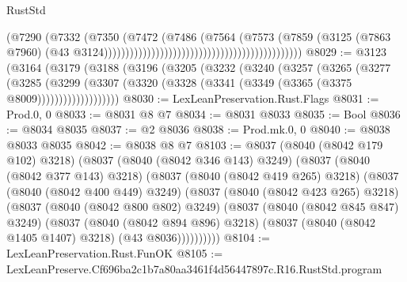 \begin{lexlean}{RustStd}
\begin{coremodule}
                                                                            (@7290
                                                                              (@7332
                                                                                (@7350
                                                                                  (@7472
                                                                                    (@7486
                                                                                      (@7564
                                                                                        (@7573
                                                                                          (@7859
                                                                                            (@3125
                                                                                              (@7863
                                                                                                @7960)
                                                                                              (@43
                                                                                                @3124))))))))))))))))))))))))))))))))))))))))))))))
@8029 := @3123
    (@3164
      (@3179
        (@3188
          (@3196
            (@3205
              (@3232
                (@3240
                  (@3257
                    (@3265
                      (@3277
                        (@3285
                          (@3299
                            (@3307
                              (@3320 (@3328 (@3341 (@3349 (@3365 (@3375 @8009)))))))))))))))))))
@8030 := LexLeanPreservation.Rust.Flags
@8031 := Prod.{0, 0}
@8033 := @8031 @8 @7
@8034 := @8031 @8033
@8035 := Bool
@8036 := @8034 @8035
@8037 := @2 @8036
@8038 := Prod.mk.{0, 0}
@8040 := @8038 @8033 @8035
@8042 := @8038 @8 @7
@8103 := @8037
    (@8040 (@8042 @179 @102) @3218)
    (@8037
      (@8040 (@8042 @346 @143) @3249)
      (@8037
        (@8040 (@8042 @377 @143) @3218)
        (@8037
          (@8040 (@8042 @419 @265) @3218)
          (@8037
            (@8040 (@8042 @400 @449) @3249)
            (@8037
              (@8040 (@8042 @423 @265) @3218)
              (@8037
                (@8040 (@8042 @800 @802) @3249)
                (@8037
                  (@8040 (@8042 @845 @847) @3249)
                  (@8037
                    (@8040 (@8042 @894 @896) @3218)
                    (@8037 (@8040 (@8042 @1405 @1407) @3218) (@43 @8036))))))))))
@8104 := LexLeanPreservation.Rust.FunOK
@8105 := LexLeanPreserve.Cf696ba2c1b7a80aa3461f4d56447897c.R16.RustStd.program

\end{coremodule}
\end{lexlean}
